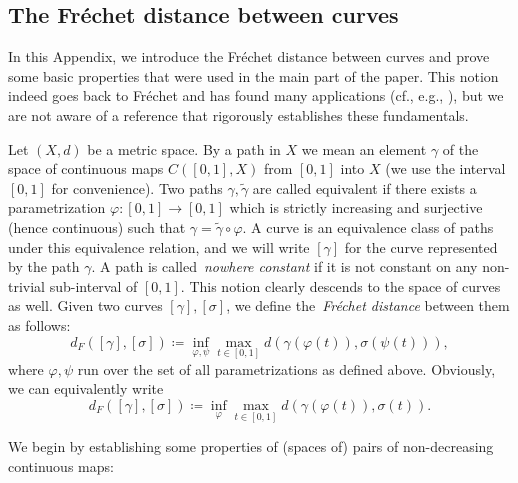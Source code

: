 \documentclass[a4paper,11pt]{article}
\numberwithin{equation}{section}
\theoremstyle{plain}
\theoremstyle{definition}
\begin{document}
\begin{appendices}

\section{The Fr\'echet distance between curves}
\label{Section: appendix frechet}

In this Appendix, we introduce the Fr\'echet distance between curves and prove some basic properties that were used in the main part of the paper. This notion indeed goes back to Fr\'echet and has found many applications (cf., e.g., \cite{Alt-Godau}), but we are not aware of a reference that rigorously establishes these fundamentals.

Let $(X,d)$ be a metric space. By a path in $X$ we mean an element $\gamma$ of the space of continuous maps $C([0,1],X)$ from $[0,1]$ into $X$ (we use the interval $[0,1]$ for convenience). Two paths $\gamma, \tilde{\gamma}$ are called equivalent if there exists a parametrization $\varphi \colon [0,1] \to [0,1]$ which is strictly increasing and surjective (hence continuous) such that $\gamma=\tilde{\gamma}\circ \varphi$. A curve is an equivalence class of paths under this equivalence relation, and we will
write $[\gamma]$ for the curve represented by the path $\gamma$. A path is called~\emph{nowhere constant\/} if it is not constant on any non-trivial sub-interval of $[0,1]$. This notion clearly descends to the space of curves as well. Given two curves $[\gamma],[\sigma]$, we define the~\emph{Fr\'echet distance\/} between them as follows:
\begin{equation}\label{eq:Frechet-distance}
    d_F([\gamma],[\sigma]) \coloneqq \inf_{\varphi,\psi} \max_{t \in [0,1]} d(\gamma(\varphi(t)),\sigma(\psi(t))),
\end{equation}
where $\varphi, \psi$ run over the set of all parametrizations as defined above. Obviously, we can equivalently write
\begin{equation*}
    d_F([\gamma],[\sigma]) \coloneqq \inf_{\varphi} \max_{t\in [0,1]} d(\gamma(\varphi(t)),\sigma(t)). 
\end{equation*}

We begin by establishing some properties of (spaces of) pairs of non-decreasing continuous maps:


\end{appendices}
\end{document}
